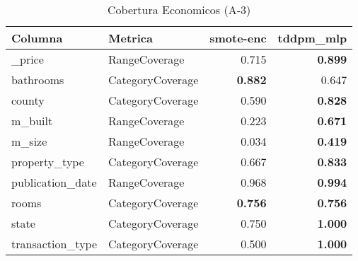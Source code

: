 \begin{table}[H]
\centering
\caption{Cobertura Economicos (A-3)}
\label{table-coverage-economicos-a-3}
\begin{tabular}{|l|l|r|r|}
\hline
\rowcolor[gray]{0.8}
Columna & Metrica & smote-enc & tddpm\_mlp \\
\hline \_price & RangeCoverage & 0.715 & \bfseries 0.899 \\
\hline bathrooms & CategoryCoverage & \bfseries 0.882 & 0.647 \\
\hline county & CategoryCoverage & 0.590 & \bfseries 0.828 \\
\hline m\_built & RangeCoverage & 0.223 & \bfseries 0.671 \\
\hline m\_size & RangeCoverage & 0.034 & \bfseries 0.419 \\
\hline property\_type & CategoryCoverage & 0.667 & \bfseries 0.833 \\
\hline publication\_date & RangeCoverage & 0.968 & \bfseries 0.994 \\
\hline rooms & CategoryCoverage & \bfseries 0.756 & \bfseries 0.756 \\
\hline state & CategoryCoverage & 0.750 & \bfseries 1.000 \\
\hline transaction\_type & CategoryCoverage & 0.500 & \bfseries 1.000 \\
\hline
\end{tabular}
\end{table}
